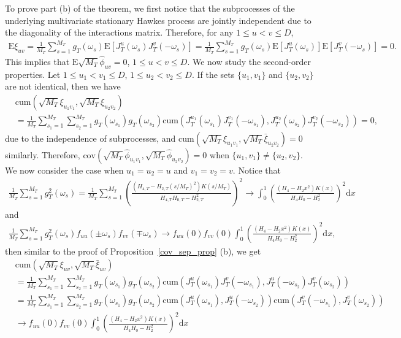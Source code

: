 \documentclass[11pt]{article}
\numberwithin{equation}{section}
\theoremstyle{plain}
\theoremstyle{definition}
\theoremstyle{definition}
\theoremstyle{assumption}
\theoremstyle{proposition}
\theoremstyle{proposition}
\theoremstyle{example}
\theoremstyle{lemma}
\theoremstyle{theorem}
\theoremstyle{remark}
\begin{document}
To prove part (b) of the theorem, we first notice that the subprocesses of the underlying multivariate stationary Hawkes process are jointly independent due to the diagonality of the interactions matrix. Therefore, for any $1\leqslant u<v\leqslant D$,
\begin{align*}
\mathrm{E}\xi_{uv} = \frac{1}{M_T}\sum_{s=1}^{M_T}g_T(\omega_s)\mathrm{E}[J_{T}^{u}(\omega_s)J_{T}^{v}(-\omega_s)]
=\frac{1}{M_T}\sum_{s=1}^{M_T}g_T(\omega_s)\mathrm{E}[J_{T}^{u}(\omega_s)]\mathrm{E}[J_{T}^{v}(-\omega_s)]
=0.
\end{align*}
This implies that $\mathrm{E}\sqrt{M_T}\hat{\phi}_{uv} = 0$, $1\leqslant u<v\leqslant D$. We now study the second-order properties. Let $1\leqslant u_1<v_1\leqslant D$, $1\leqslant u_2<v_2\leqslant D$. If the sets $\{u_1,v_1\}$ and $\{u_2,v_2\}$ are not identical, then we have
\begin{align*}
&\mathrm{cum}(\sqrt{M_T}\xi_{u_1v_1}, \sqrt{M_T}\xi_{u_2v_2}) \\
&= \frac{1}{M_T}\sum_{s_1=1}^{M_T}\sum_{s_2=1}^{M_T}g_T(\omega_{s_1})g_T(\omega_{s_2})\mathrm{cum}(J_{T}^{u_1}(\omega_{s_1})J_{T}^{v_1}(-\omega_{s_1}), J_{T}^{u_2}(\omega_{s_2})J_{T}^{v_2}(-\omega_{s_2}))
=0,
\end{align*}
due to the independence of subprocesses, and $\mathrm{cum}(\sqrt{M_T}\xi_{u_1v_1}, \sqrt{M_T}\bar{\xi}_{u_2v_2})=0$ similarly. Therefore, $\mathrm{cov}(\sqrt{M_T}\hat{\phi}_{u_1v_1}, \sqrt{M_T}\hat{\phi}_{u_2v_2})=0$ when $\{u_1,v_1\} \neq \{u_2,v_2\}$. We now consider the case when $u_1=u_2=u$ and $v_1=v_2=v$. Notice that 
\begin{align*}
\frac{1}{M_T}\sum_{s=1}^{M_T}g_T^2(\omega_{s})
=\frac{1}{M_T}\sum_{s=1}^{M_T} \left(\frac{(H_{4,T} - H_{2,T}(s/M_T)^2)K(s/M_T)}{H_{4,T}H_{0,T} - H_{2,T}^2}\right)^2 
\rightarrow \int_{0}^{1} \left(\frac{(H_4 - H_2 x^2)K(x)}{H_4H_0 - H_2^2}\right)^2\mathrm{d}x
\end{align*}
and
\begin{align*}
\frac{1}{M_T}\sum_{s=1}^{M_T}g_T^2(\omega_{s}) f_{u u}(\pm\omega_s)f_{v v}(\mp\omega_s)
\rightarrow f_{u u}(0)f_{v v}(0)\int_{0}^{1} \left(\frac{(H_4 - H_2 x^2)K(x)}{H_4H_0 - H_2^2}\right)^2\mathrm{d}x,
\end{align*} 
then similar to the proof of Proposition~\ref{cov_sep_prop} (b), we get
\begin{align*}
&\mathrm{cum}(\sqrt{M_T}\xi_{uv}, \sqrt{M_T}\bar{\xi}_{uv}) \\
&= \frac{1}{M_T}\sum_{s_1=1}^{M_T}\sum_{s_2=1}^{M_T}g_T(\omega_{s_1})g_T(\omega_{s_2})\mathrm{cum}(J_{T}^{u}(\omega_{s_1})J_{T}^{v}(-\omega_{s_1}), J_{T}^{u}(-\omega_{s_2})J_{T}^{v}(\omega_{s_2})) \\
&= \frac{1}{M_T}\sum_{s_1=1}^{M_T}\sum_{s_2=1}^{M_T}g_T(\omega_{s_1})g_T(\omega_{s_2})\mathrm{cum}(J_{T}^{u}(\omega_{s_1}), J_{T}^{u}(-\omega_{s_2}))\mathrm{cum}(J_{T}^{v}(-\omega_{s_1}), J_{T}^{v}(\omega_{s_2})) \\
&\rightarrow f_{uu}(0)f_{vv}(0)\int_{0}^{1} \left(\frac{(H_4 - H_2 x^2)K(x)}{H_4H_0 - H_2^2}\right)^2\mathrm{d}x
\end{align*}
\end{document}
